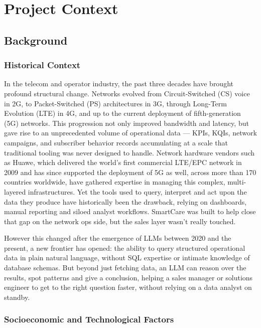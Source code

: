 \section{Project Context}

\subsection{Background}

\subsubsection{Historical Context}

In the telecom and operator industry, the past three decades have brought profound 
structural change. Networks evolved from Circuit-Switched (CS) voice in 2G, to 
Packet-Switched (PS) architectures in 3G, through Long-Term Evolution (LTE) in 4G, 
and up to the current deployment of fifth-generation (5G) networks. This progression 
not only improved bandwidth and latency, but gave rise to an unprecedented volume of 
operational data --- KPIs, KQIs, network campaigns, and subscriber behavior records 
accumulating at a scale that traditional tooling was never designed to handle. 
Network hardware vendors such as Huawe, which delivered the world's first commercial LTE/EPC network 
in 2009 and has since supported the deployment of 5G as well, across more than 170 countries 
worldwide, have gathered expertise in managing this complex, multi-layered infrastructures. Yet 
the tools used to query, interpret and act upon the data they produce have historically been the 
drawback, relying on dashboards, manual reporting and siloed analyst workflows. SmartCare was built to 
help close that gap on the network ops side, but the sales layer wasn't really touched.

However this changed after the emergence of LLMs between 2020 and the present, a new frontier has opened:
the ability to query structured operational data in plain natural language, without SQL expertise 
or intimate knowledge of database schemas. But beyond just fetching data, an LLM can reason over the results, 
spot patterns and give a conclusion, helping a sales manager or solutions engineer to get to the 
right question faster, without relying on a data analyst on standby.
\subsubsection{Socioeconomic and Technological Factors}

